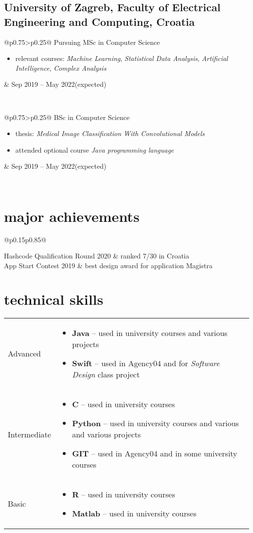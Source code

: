 \documentclass[a4paper]{article}
\makeatletter
\newlength{\tablewidth}
\newenvironment{period}[2]{%
\newcommand{\sarma}{#2}%
\setlength{\tablewidth}{\linewidth}
\addtolength{\tablewidth}{-2\tabcolsep}
\begin{tabular}{@{}p{0.75\tablewidth}>{\raggedleft\arraybackslash}p{0.25\tablewidth}@{}}%
#1 \newline
\begin{itemize}
}{%
\end{itemize} & \sarma \\%
\end{tabular}\\
}
\newenvironment{skills}{%
\setlength{\tablewidth}{\linewidth}
\addtolength{\tablewidth}{-2\tabcolsep}
\begin{tabular}{@{}p{0.15\tablewidth}p{0.85\tablewidth}@{}}
}{%
\end{tabular}
}
\makeatother
\begin{document}
\subsection{University of Zagreb, Faculty of Electrical Engineering and Computing, Croatia}
\begin{period}{Pursuing MSc in Computer Science}{Sep 2019 -- May 2022\linebreak(expected)}
    \item relevant courses:
        \textit{Machine Learning},
        \textit{Statistical Data Analysis},
        \textit{Artificial Intelligence},
        \textit{Complex Analysis}
\end{period}
\begin{period}{BSc in Computer Science}{Sep 2016 -- Jul 2019}
    \item thesis:
        \textit{Medical Image Classification With Convolutional Models}
    \item attended optional course \textit{Java programming language}
\end{period}

\section{major achievements}
\begin{skills}
    Hashcode Qualification Round 2020   &   ranked 7/30 in Croatia\\
    App Start Contest 2019  &   best design award for application Magistra
\end{skills}

\section{technical skills}
\begin{skills}
    Advanced &
    \begin{itemize}
        \item \textbf{Java} -- used in university courses and various projects
        \item \textbf{Swift} -- used in Agency04 and for \textit{Software Design} class project
    \end{itemize} \\
    Intermediate &
    \begin{itemize}
        \item \textbf{C} -- used in university courses
        \item \textbf{Python} -- used in university courses and various and various projects
        \item \textbf{GIT} -- used in Agency04 and in some university courses
    \end{itemize} \\
    Basic &
    \begin{itemize}
        \item \textbf{R} -- used in university courses
        \item \textbf{Matlab} -- used in university courses
    \end{itemize} \\
\end{skills}
\end{document}
